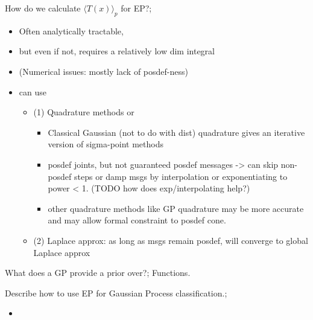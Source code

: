 \documentclass{article}
\begin{document}
How do we calculate $\langle T(x) \rangle_p$ for EP?; \begin{itemize}
    \item Often analytically tractable, 
    \item but even if not, requires a relatively low dim integral 
    \item (Numerical issues: mostly lack of posdef-ness)
    \item can use \begin{itemize}
        \item (1) Quadrature methods or 
        \begin{itemize}
            \item Classical Gaussian (not to do with dist) quadrature gives an iterative version of sigma-point methods
            \item posdef joints, but not guaranteed posdef messages -> can skip non-posdef steps or damp msgs by interpolation or exponentiating to power < 1. (TODO how does exp/interpolating help?)
            \item other quadrature methods like GP quadrature may be more accurate and  may allow formal constraint to posdef cone.
        \end{itemize}
        \item (2) Laplace approx: as long as msgs remain posdef, will converge to global Laplace approx
    \end{itemize}
\end{itemize}

What does a GP provide a prior over?; Functions.

Describe how to use EP for Gaussian Process classification.; \begin{itemize}
    \item 
\end{itemize}


\end{document}
